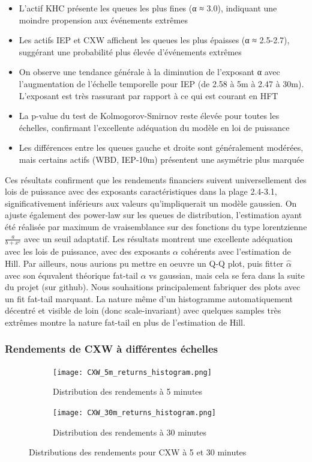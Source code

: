 \documentclass[10pt,a4paper]{article}
\theoremstyle{definition}
\theoremstyle{remark}
\begin{document}
\begin{itemize}
    \item L'actif KHC présente les queues les plus fines (α ≈ 3.0), indiquant une moindre propension aux événements extrêmes
    \item Les actifs IEP et CXW affichent les queues les plus épaisses (α ≈ 2.5-2.7), suggérant une probabilité plus élevée d'événements extrêmes
    \item On observe une tendance générale à la diminution de l'exposant α avec l'augmentation de l'échelle temporelle pour IEP (de 2.58 à 5m à 2.47 à 30m). L'exposant est très rassurant par rapport à ce qui est courant en HFT \cite{saddier2024bayesiantheorymarketimpact}
    \item La p-value du test de Kolmogorov-Smirnov reste élevée pour toutes les échelles, confirmant l'excellente adéquation du modèle en loi de puissance
    \item Les différences entre les queues gauche et droite sont généralement modérées, mais certains actifs (WBD, IEP-10m) présentent une asymétrie plus marquée
\end{itemize}
Ces résultats confirment que les rendements financiers suivent universellement des lois de puissance avec des exposants caractéristiques dans la plage 2.4-3.1, significativement inférieurs aux valeurs qu'impliquerait un modèle gaussien. On ajuste également des power-law sur les queues de distribution, l'estimation ayant été réalisée par maximum de vraisemblance sur des fonctions du type lorentzienne $\frac{a}{b+x^c}$ avec un seuil adaptatif. Les résultats montrent une excellente adéquation avec les lois de puissance, avec des exposants $\alpha$ cohérents avec l'estimation de Hill. Par ailleurs, nous aurions pu mettre en oeuvre un Q-Q plot, puis fitter $\hat \alpha$ avec son équvalent théorique fat-tail $\alpha$ vs gaussian, mais cela se fera dans la suite du projet (sur github). Nous souhaitions principalement fabriquer des plots avec un fit fat-tail marquant. La nature même d'un histogramme automatiquement décentré et visible de loin (donc scale-invariant) avec quelques samples très extrêmes montre la nature fat-tail en plus de l'estimation de Hill.

\subsubsection{Rendements de CXW à différentes échelles}

\begin{figure}[H]
    \centering
    \begin{subfigure}[b]{0.45\textwidth}
        \texttt{[image: CXW\_5m\_returns\_histogram.png]}
        \caption{Distribution des rendements à 5 minutes}
        \label{fig:CXW_5m_moved}
    \end{subfigure}
    \hfill
    \begin{subfigure}[b]{0.45\textwidth}
        \texttt{[image: CXW\_30m\_returns\_histogram.png]}
        \caption{Distribution des rendements à 30 minutes}
        \label{fig:CXW_30m_moved}
    \end{subfigure}
    \caption{Distributions des rendements pour CXW à 5 et 30 minutes}
\end{figure}
\end{document}
